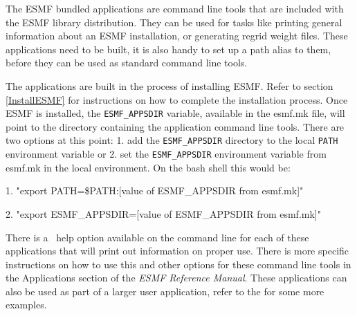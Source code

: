 
The ESMF bundled applications are command line tools that are included
with the ESMF library distribution.  They can be used for tasks like
printing general information about an ESMF installation, or generating
regrid weight files.  These applications need to be built, it is also
handy to set up a path alias to them, before they 
can be used as standard command line tools.

The applications are built in the process of installing ESMF.  Refer 
to section \ref{InstallESMF} for instructions on how to complete the 
installation process.  Once ESMF is installed, the {\tt ESMF\_APPSDIR} 
variable, available in the esmf.mk file,
will point to the directory containing the application command line 
tools.  There are two options at this point: 1. add the {\tt ESMF\_APPSDIR}
directory to the local {\tt PATH} environment variable or 2. set the 
{\tt ESMF\_APPSDIR} environment variable from esmf.mk in the local 
environment.  On the bash shell this would be:

1. "export PATH=\$PATH:[value of ESMF\_APPSDIR from esmf.mk]"

2. "export ESMF\_APPSDIR=[value of ESMF\_APPSDIR from esmf.mk]"

There is a \-~\-help option available on the command line for each 
of these applications that will print out information on proper use.  
There is more specific instructions on how to use
this and other options for these command line tools in the Applications section
of the {\it ESMF Reference Manual}.  These applications can
also be used as part of a larger user application, refer to the 
for some more examples.  
